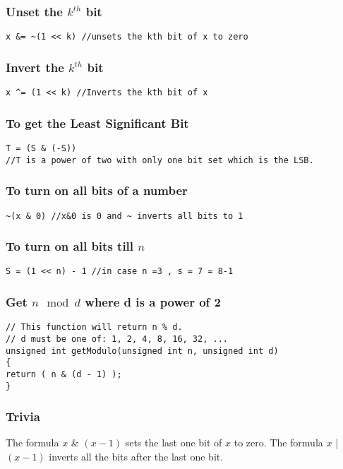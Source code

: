 \documentclass[twoside,12pt,a4paper,english]{book}
\theoremstyle{definition}
\theoremstyle{problemstyle}
\begin{document}
\subsubsection{Unset the $k^{th}$ bit}
\begin{lstlisting}
x &= ~(1 << k) //unsets the kth bit of x to zero
\end{lstlisting}
\subsubsection{Invert the $k^{th}$ bit}
\begin{lstlisting}
x ^= (1 << k) //Inverts the kth bit of x
\end{lstlisting}
\subsubsection{To get the Least Significant Bit}
\begin{lstlisting}
T = (S & (-S))
//T is a power of two with only one bit set which is the LSB.
\end{lstlisting}
\subsubsection{To turn on all bits of a number}
\begin{lstlisting}
~(x & 0) //x&0 is 0 and ~ inverts all bits to 1
\end{lstlisting}
\subsubsection{To turn on all bits till $n$}
\begin{lstlisting}
S = (1 << n) - 1 //in case n =3 , s = 7 = 8-1
\end{lstlisting}
\subsubsection{Get $n \mod d$ where d is a power of 2}
\begin{lstlisting}
// This function will return n % d.
// d must be one of: 1, 2, 4, 8, 16, 32, ...
unsigned int getModulo(unsigned int n, unsigned int d)
{
return ( n & (d - 1) );
}
\end{lstlisting}
\subsubsection{Trivia}
The formula $x$ \& $(x-1)$ sets the last
one bit of $x$ to zero.
The formula $x$ | $(x-1)$
inverts all the bits after the last one bit.
\end{document}
